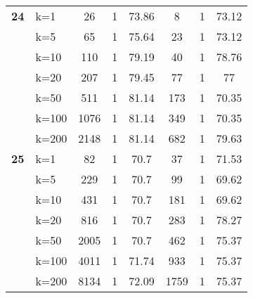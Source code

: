 \begin{table}[htbp]
\begin{tabular}{|l|l|c|c|c|c|c|c|}
    \multicolumn{1}{|r|}{\textbf{24}} & k=1 & 26 & 1 & 73.86 & 8 & 1 & 73.12 \\ 
     & k=5 & 65 & 1 & 75.64 & 23 & 1 & 73.12 \\ 
     & k=10 & 110 & 1 & 79.19 & 40 & 1 & 78.76 \\ 
     & k=20 & 207 & 1 & 79.45 & 77 & 1 & 77 \\ 
     & k=50 & 511 & 1 & 81.14 & 173 & 1 & 70.35 \\ 
     & k=100 & 1076 & 1 & 81.14 & 349 & 1 & 70.35 \\ 
     & k=200 & 2148 & 1 & 81.14 & 682 & 1 & 79.63 \\ \hline
    \multicolumn{1}{|r|}{\textbf{25}} & k=1 & 82 & 1 & 70.7 & 37 & 1 & 71.53 \\ 
     & k=5 & 229 & 1 & 70.7 & 99 & 1 & 69.62 \\ 
     & k=10 & 431 & 1 & 70.7 & 181 & 1 & 69.62 \\ 
     & k=20 & 816 & 1 & 70.7 & 283 & 1 & 78.27 \\ 
     & k=50 & 2005 & 1 & 70.7 & 462 & 1 & 75.37 \\ 
     & k=100 & 4011 & 1 & 71.74 & 933 & 1 & 75.37 \\ 
     & k=200 & 8134 & 1 & 72.09 & 1759 & 1 & 75.37 \\ \hline
    \end{tabular}
\end{table}
